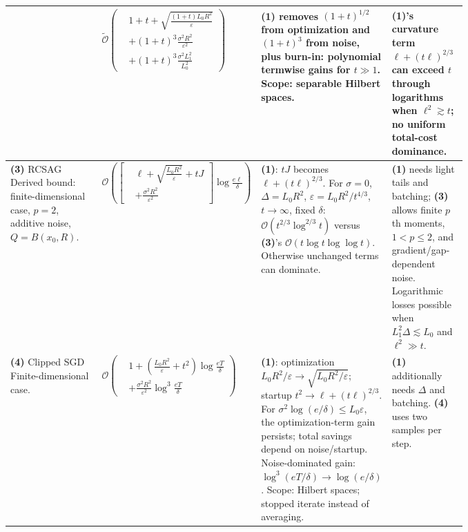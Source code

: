 \begin{table}[tp]
\begin{threeparttable}
\begin{tabularx}{\linewidth}{@{}>{\raggedright\arraybackslash}p{0.20\linewidth}>{\raggedright\arraybackslash}p{0.32\linewidth}>{\raggedright\arraybackslash}p{0.25\linewidth}>{\raggedright\arraybackslash}X@{}}
& $\displaystyle\widetilde{\mathcal{O}}\!\left(\begin{aligned}&1+t+\sqrt{\frac{(1+t)L_0R^2}{\varepsilon}}\\&+(1+t)^3\frac{\sigma^2R^2}{\varepsilon^2}\\&+(1+t)^3\frac{\sigma^2L_1^2}{L_0^2}\end{aligned}\right)$
& \textbf{(1)} removes $(1+t)^{1/2}$ from optimization and $(1+t)^3$ from noise, plus burn-in: polynomial termwise gains for $t\gg1$. Scope: separable Hilbert spaces.
& \textbf{(1)}'s curvature term $\ell+(t\ell)^{2/3}$ can exceed $t$ through logarithms when $\ell^2\gtrsim t$; no uniform total-cost dominance. \\
\midrule
\textbf{(3)} RCSAG \citep[Thm.~9]{gssgLobanov2026}\newline Derived bound: finite-dimensional case, $p=2$, additive noise, $Q=B(x_0,R)$.
& $\displaystyle\mathcal{O}\!\left(\left[\begin{aligned}&\ell+\sqrt{\frac{L_0R^2}{\varepsilon}}+tJ\\&+\frac{\sigma^2R^2}{\varepsilon^2}\end{aligned}\right]\log\frac{e\ell}{\delta}\right)$
& \textbf{(1)}: $tJ$ becomes $\ell+(t\ell)^{2/3}$. For $\sigma=0$, $\Delta=L_0R^2$, $\varepsilon=L_0R^2/t^{4/3}$, $t\to\infty$, fixed $\delta$: $\mathcal{O}(t^{2/3}\log^{2/3}t)$ versus \textbf{(3)}'s $\mathcal{O}(t\log t\log\log t)$. Otherwise unchanged terms can dominate.
& \textbf{(1)} needs light tails and batching; \textbf{(3)} allows finite $p$th moments, $1<p\le2$, and gradient/gap-dependent noise. Logarithmic losses possible when $L_1^2\Delta\lesssim L_0$ and $\ell^2\gg t$. \\
\midrule
\textbf{(4)} Clipped SGD \citep[Thm.~1]{sgacGaash2025v2}\newline Finite-dimensional case.
& $\displaystyle\mathcal{O}\!\left(\begin{aligned}&1+\left(\frac{L_0R^2}{\varepsilon}+t^2\right)\log\frac{eT}{\delta}\\&+\frac{\sigma^2R^2}{\varepsilon^2}\log^3\frac{eT}{\delta}\end{aligned}\right)$
& \textbf{(1)}: optimization $L_0R^2/\varepsilon\to\sqrt{L_0R^2/\varepsilon}$; startup $t^2\to\ell+(t\ell)^{2/3}$. For $\sigma^2\log(e/\delta)\le L_0\varepsilon$, the optimization-term gain persists; total savings depend on noise/startup. Noise-dominated gain: $\log^3(eT/\delta)\to\log(e/\delta)$. Scope: Hilbert spaces; stopped iterate instead of averaging.
& \textbf{(1)} additionally needs $\Delta$ and batching. \textbf{(4)} uses two samples per step. \\

\end{tabularx}
\end{threeparttable}
\end{table}
